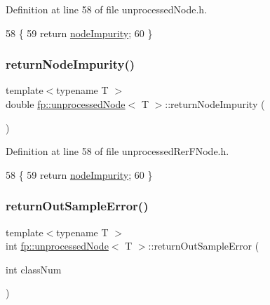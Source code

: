 Definition at line 58 of file unprocessed\+Node.\+h.


\begin{DoxyCode}
58                                                   \{
59                     \textcolor{keywordflow}{return} \hyperlink{classfp_1_1unprocessedNode_a5bb6906b09625f7893bf0ffd512b1714}{nodeImpurity};
60                 \}
\end{DoxyCode}
\mbox{\label{classfp_1_1unprocessedNode_af44e7657d88e4a7bc61b22d97267f940}} 
\subsubsection{\texorpdfstring{return\+Node\+Impurity()}{returnNodeImpurity()}\hspace{0.1cm}{\footnotesize\ttfamily [2/2]}}
{\footnotesize\ttfamily template$<$typename T $>$ \\
double \hyperlink{classfp_1_1unprocessedNode}{fp\+::unprocessed\+Node}$<$ T $>$\+::return\+Node\+Impurity (\begin{DoxyParamCaption}{ }\end{DoxyParamCaption})\hspace{0.3cm}{\ttfamily [inline]}}



Definition at line 58 of file unprocessed\+Rer\+F\+Node.\+h.


\begin{DoxyCode}
58                                                   \{
59                     \textcolor{keywordflow}{return} \hyperlink{classfp_1_1unprocessedNode_a5bb6906b09625f7893bf0ffd512b1714}{nodeImpurity};
60                 \}
\end{DoxyCode}
\mbox{\label{classfp_1_1unprocessedNode_afbeba7b37bd021e36545af60676f05d5}} 
\subsubsection{\texorpdfstring{return\+Out\+Sample\+Error()}{returnOutSampleError()}\hspace{0.1cm}{\footnotesize\ttfamily [1/2]}}
{\footnotesize\ttfamily template$<$typename T $>$ \\
int \hyperlink{classfp_1_1unprocessedNode}{fp\+::unprocessed\+Node}$<$ T $>$\+::return\+Out\+Sample\+Error (\begin{DoxyParamCaption}\item[{int}]{class\+Num }\end{DoxyParamCaption})\hspace{0.3cm}{\ttfamily [inline]}}



